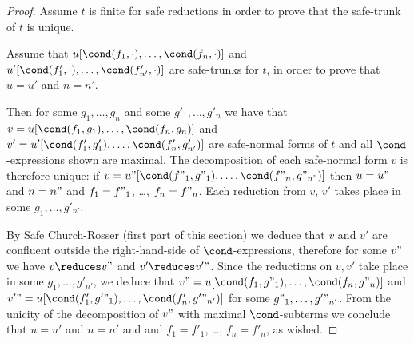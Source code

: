 \begin{proof}
Assume $t$ is finite for safe reductions in order to prove that the safe-trunk of $t$ is unique.

Assume that $u[\cond(f_1,\cdot), \ldots, \cond(f_n,\cdot)]$ and
$u'[\cond(f'_1,\cdot), \ldots, \cond(f'_{n'},\cdot)]$ are safe-trunks for $t$, in order to prove
that $u=u'$ and $n=n'$. 

Then for some $g_1, \ldots,g_n$ and some $g'_1, \ldots,g'_n$ we have that 
$v = u[\cond(f_1,g_1), \ldots, \cond(f_n,g_n)]$ and 
$v' = u'[\cond(f'_1,g'_1), \ldots, \cond(f'_n,g'_{n'})]$ 
are safe-normal forms of $t$ and all $\cond$-expressions shown are maximal. 
The decomposition of each safe-normal form $v$ is therefore unique:
if $v = u"[\cond(f"_1,g"_1), \ldots, \cond(f"_n,g"_{n"})]$ then $u=u"$ and $n=n"$
and $f_1=f"_1$, \ldots, $f_n=f"_n$.
Each reduction from $v$, $v'$ takes place in some $g_1, \ldots,g'_{n'}$. 

By Safe Church-Rosser  (first part of this section) we deduce that $v$ and $v'$ are confluent
outside the right-hand-side of $\cond$-expressions, therefore
for some $v"$ we have $v \reduces v"$ and $v' \reduces v'"$. 
Since the reductions on $v, v'$ take place in some $g_1, \ldots,g'_{n'}$, 
we deduce that $v" = u[\cond(f_1,g"_1), \ldots, \cond(f_n,g"_n)]$
and $v'" = u[\cond(f'_1,g'"_1), \ldots, \cond(f'_n,g'"_{n'})]$ for some $g"_1, \ldots,g'"_{n'}$.
From the unicity of the decomposition of $v"$
with maximal $\cond$-subterms we conclude that $u=u'$ and $n=n'$
and and $f_1=f'_1$, \ldots, $f_n=f'_n$, as wished.

\end{proof}


